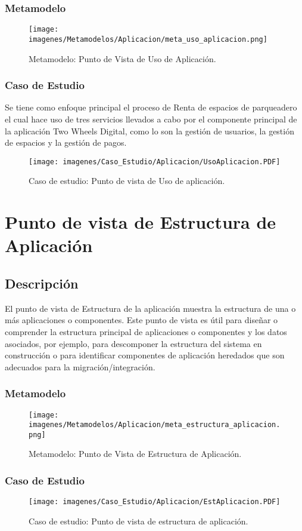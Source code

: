 \subsubsection{Metamodelo}
\begin{figure}[h]
	\centering
	\texttt{[image: imagenes/Metamodelos/Aplicacion/meta\_uso\_aplicacion.png]}
	\caption{Metamodelo: Punto de Vista de Uso de Aplicación.}
	\label{fig:gap_analysis}
\end{figure}

\subsubsection{Caso de Estudio}
Se tiene como enfoque principal el proceso de Renta de espacios de parqueadero el cual hace uso de tres servicios llevados a cabo por el componente principal de la aplicación Two Wheels Digital, como lo son la gestión de usuarios, la gestión de espacios y la gestión de pagos.

\begin{figure}[h]
	\centering
	\texttt{[image: imagenes/Caso\_Estudio/Aplicacion/UsoAplicacion.PDF]}
	\caption{Caso de estudio: Punto de vista de Uso de aplicación.}
	\label{fig:gap_analysis}
\end{figure}

\section{Punto de vista de Estructura de Aplicación}
\subsection{Descripción}
El punto de vista de Estructura de la aplicación muestra la estructura de una o más aplicaciones
o componentes. Este punto de vista es útil para diseñar o comprender la estructura principal de
aplicaciones o componentes y los datos asociados, por ejemplo, para descomponer la estructura del
sistema en construcción o para identificar componentes de aplicación heredados que son adecuados
para la migración/integración.


\subsubsection{Metamodelo}
\begin{figure}[h]
	\centering
	\texttt{[image: imagenes/Metamodelos/Aplicacion/meta\_estructura\_aplicacion.png]}
	\caption{Metamodelo: Punto de Vista de Estructura de Aplicación.}
	\label{fig:gap_analysis}
\end{figure}


\subsubsection{Caso de Estudio}

\begin{figure}[h]
	\centering
	\texttt{[image: imagenes/Caso\_Estudio/Aplicacion/EstAplicacion.PDF]}
	\caption{Caso de estudio: Punto de vista de estructura de aplicación.}
	\label{fig:gap_analysis}
\end{figure}
